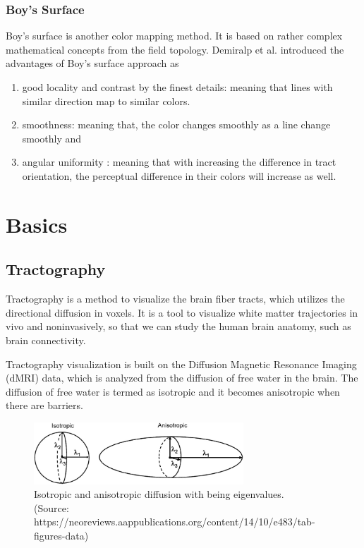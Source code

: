 \documentclass[hyperref, plainreport, noproblem]{cgvpub1}
\begin{document}
\subsection{Boy’s Surface}  
Boy's surface is another color mapping method. It is based on rather complex mathematical concepts from the field topology. 
Demiralp et al. \cite{demiralp} introduced the advantages of Boy’s surface approach as 
\begin{enumerate}
	\item good locality and contrast by the finest details: meaning that lines with similar direction map to similar colors.
	\item smoothness: meaning that, the color changes smoothly as a line change smoothly and 
	\item angular uniformity \cite{chen}: meaning that with increasing the difference in tract orientation, the perceptual difference in their colors will increase as well.
\end{enumerate}


\chapter{Basics}

\section{Tractography}
Tractography is a method to visualize the brain fiber tracts, which utilizes the directional diffusion in voxels. It is a tool to visualize white matter trajectories in vivo and noninvasively, so that we can study the human brain anatomy, such as brain connectivity.

Tractography visualization is built on the Diffusion Magnetic Resonance Imaging (dMRI) data, which is analyzed from the diffusion of free water in the brain. The diffusion of free water is termed as isotropic and it becomes anisotropic when there are barriers. 

\begin{figure}[h]
	\centering
	\includegraphics[width=0.7\textwidth]{iso_ani_diff}
	\caption{Isotropic and anisotropic diffusion with  being eigenvalues. \\ (Source: https://neoreviews.aappublications.org/content/14/10/e483/tab-figures-data)}
	\label{fig:iso_ani_diff}
\end{figure}
\end{document}
